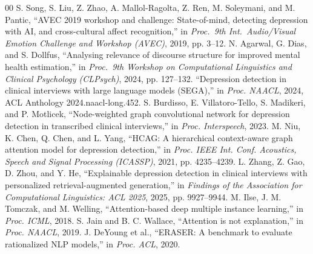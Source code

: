\documentclass[conference]{IEEEtran}
\begin{document}
\begin{thebibliography}{00}
S. Song, S. Liu, Z. Zhao, A. Mallol-Ragolta, Z. Ren, M. Soleymani, and
M. Pantic, ``AVEC 2019 workshop and challenge: State-of-mind, detecting
depression with AI, and cross-cultural affect recognition,'' in \emph{Proc.\ 9th
Int.\ Audio/Visual Emotion Challenge and Workshop (AVEC)}, 2019, pp. 3--12.
 N. Agarwal, G. Dias, and S. Dollfus, ``Analysing
relevance of discourse structure for improved mental health estimation,'' in
\emph{Proc.\ 9th Workshop on Computational Linguistics and Clinical Psychology
(CLPsych)}, 2024, pp. 127--132.
 ``Depression detection in clinical interviews with large
language models (SEGA),'' in \emph{Proc. NAACL}, 2024,
ACL Anthology 2024.naacl-long.452.
 S. Burdisso, E. Villatoro-Tello, S. Madikeri, and
P. Motlicek, ``Node-weighted graph convolutional network for depression
detection in transcribed clinical interviews,'' in \emph{Proc. Interspeech},
2023.
 M. Niu, K. Chen, Q. Chen, and L. Yang, ``HCAG: A hierarchical
context-aware graph attention model for depression detection,'' in \emph{Proc.
IEEE Int. Conf. Acoustics, Speech and Signal Processing (ICASSP)}, 2021,
pp. 4235--4239.
 L. Zhang, Z. Gao, D. Zhou, and Y. He, ``Explainable
depression detection in clinical interviews with personalized
retrieval-augmented generation,'' in \emph{Findings of the Association for
Computational Linguistics: ACL 2025}, 2025, pp. 9927--9944.
 M. Ilse, J. M. Tomczak, and M. Welling, ``Attention-based
deep multiple instance learning,'' in \emph{Proc. ICML}, 2018.
 S. Jain and B. C. Wallace, ``Attention is not explanation,''
in \emph{Proc. NAACL}, 2019.
 J. DeYoung et al., ``ERASER: A benchmark to evaluate
rationalized NLP models,'' in \emph{Proc. ACL}, 2020.
\end{thebibliography}
\end{document}
